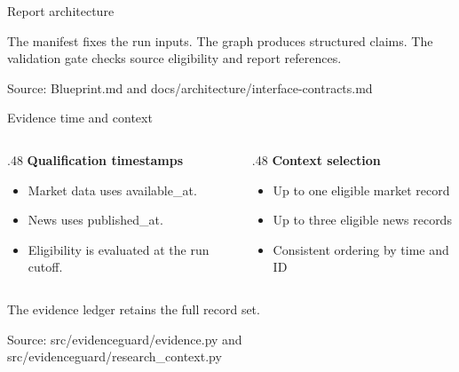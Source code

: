 \documentclass[aspectratio=169,11pt,t]{beamer}
\newcommand{\source}[1]{\par\vfill{\fontsize{6.6}{8}\selectfont\color{CityUMuted}Source: #1\par}}
\newcommand{\code}[1]{{\ttfamily\small #1}}
\begin{document}
\begin{frame}{Report architecture}
 \centering
 \par\medskip\raggedright
 The manifest fixes the run inputs. The graph produces structured claims. The validation gate checks source eligibility and report references.
 \source{Blueprint.md and docs/architecture/interface-contracts.md}
\end{frame}

\begin{frame}{Evidence time and context}
 \begin{columns}[T,onlytextwidth]
 \begin{column}{.48\textwidth}
 \textbf{Qualification timestamps}\medskip
 \begin{itemize}\setlength\itemsep{7pt}
 \item Market data uses \code{available\_at}.
 \item News uses \code{published\_at}.
 \item Eligibility is evaluated at the run cutoff.
 \end{itemize}
 \end{column}
 \begin{column}{.48\textwidth}
 \textbf{Context selection}\medskip
 \begin{itemize}\setlength\itemsep{7pt}
 \item Up to one eligible market record
 \item Up to three eligible news records
 \item Consistent ordering by time and ID
 \end{itemize}
 \end{column}
 \end{columns}
 \medskip The evidence ledger retains the full record set.
 \source{src/evidenceguard/evidence.py and src/evidenceguard/research\_context.py}
\end{frame}
\end{document}
